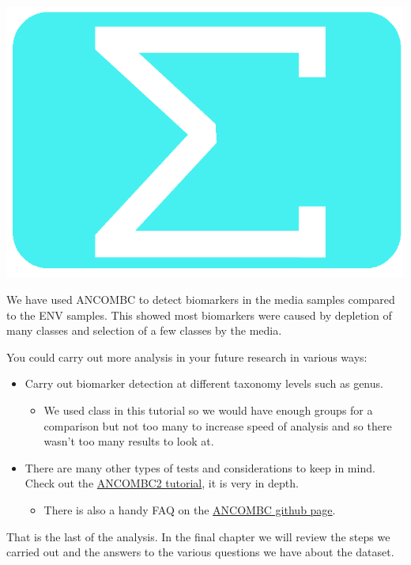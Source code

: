 \documentclass[
]{book}
\providecommand{\tightlist}{%
  \setlength{\itemsep}{0pt}\setlength{\parskip}{0pt}}
\begin{document}
\includegraphics{figures/sum_blue.png}

We have used ANCOMBC to detect biomarkers in the media samples compared to the ENV samples.
This showed most biomarkers were caused by depletion of many classes and selection of a few classes by the media.

You could carry out more analysis in your future research in various ways:

\begin{itemize}
\tightlist
\item
  Carry out biomarker detection at different taxonomy levels such as genus.

  \begin{itemize}
  \tightlist
  \item
    We used class in this tutorial so we would have enough groups for a comparison but not too many to increase speed of analysis and so there wasn't too many results to look at.
  \end{itemize}
\item
  There are many other types of tests and considerations to keep in mind. Check out the \href{https://www.bioconductor.org/packages/release/bioc/vignettes/ANCOMBC/inst/doc/ANCOMBC.html}{ANCOMBC2 tutorial}, it is very in depth.

  \begin{itemize}
  \tightlist
  \item
    There is also a handy FAQ on the \href{https://github.com/FrederickHuangLin/ANCOMBC}{ANCOMBC github page}.
  \end{itemize}
\end{itemize}

That is the last of the analysis. In the final chapter we will review the steps we carried out and the answers to the various questions we have about the dataset.
\end{document}
